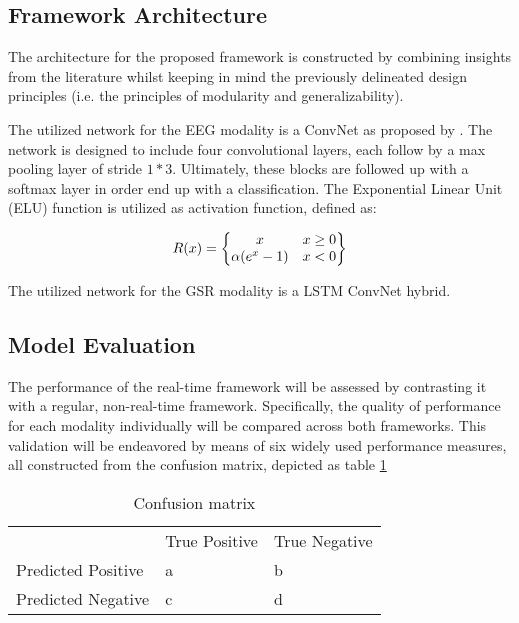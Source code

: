 \documentclass{article}
\begin{document}
\subsection{Framework Architecture}
The architecture for the proposed framework is constructed by combining insights from the literature whilst keeping in mind the previously delineated design principles (i.e. the principles of modularity and generalizability). 

The utilized network for the EEG modality is a ConvNet as proposed by . The network is designed to include four convolutional layers, each follow by a max pooling layer of stride $1* 3$. Ultimately, these blocks are followed up with a softmax layer in order end up with a classification. The Exponential Linear Unit (ELU) function is utilized as activation function, defined as: 

\begin{equation}
R(x)= 
\begin{Bmatrix}
x & x \geq0 \\ 
\alpha (e^x -1) & x<0
\end{Bmatrix}
\bigskip
\end{equation}


The utilized network for the GSR modality is a LSTM ConvNet hybrid.  



\subsection{Model Evaluation}
The performance of the real-time framework will be assessed by contrasting it with a regular, non-real-time framework. Specifically, the quality of performance for each modality individually will be compared across both frameworks. This validation will be endeavored by means of six widely used performance measures, all constructed from the confusion matrix, depicted as table  \ref{table:confusion}  
\bigskip
\bgroup
\def\arraystretch{1.6}%
\begin{table}[h]
\centering
\caption{Confusion matrix}
\label{table:confusion}
\begin{tabular}{lll}
                                        & True Positive          & True Negative          \\ \cline{2-3} 
\multicolumn{1}{l|}{Predicted Positive} & \multicolumn{1}{l|}{a} & \multicolumn{1}{l|}{b} \\ \cline{2-3} 
\multicolumn{1}{l|}{Predicted Negative} & \multicolumn{1}{l|}{c} & \multicolumn{1}{l|}{d} \\ \cline{2-3} 
\end{tabular}
\end{table}
\egroup
\end{document}
